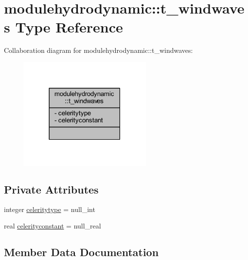 \hypertarget{structmodulehydrodynamic_1_1t__windwaves}{}\section{modulehydrodynamic\+:\+:t\+\_\+windwaves Type Reference}
\label{structmodulehydrodynamic_1_1t__windwaves}


Collaboration diagram for modulehydrodynamic\+:\+:t\+\_\+windwaves\+:\nopagebreak
\begin{figure}[H]
\begin{center}
\leavevmode
\includegraphics[width=189pt]{structmodulehydrodynamic_1_1t__windwaves__coll__graph}
\end{center}
\end{figure}
\subsection*{Private Attributes}
\begin{DoxyCompactItemize}
\item 
integer \mbox{\hyperlink{structmodulehydrodynamic_1_1t__windwaves_a2f0aa5a1fe06bbcf21cc78a316405b70}{celeritytype}} = null\+\_\+int
\item 
real \mbox{\hyperlink{structmodulehydrodynamic_1_1t__windwaves_a250b13ffad3afbe15bd361ab3ba8e1be}{celerityconstant}} = null\+\_\+real
\end{DoxyCompactItemize}


\subsection{Member Data Documentation}
\mbox{\label{structmodulehydrodynamic_1_1t__windwaves_a250b13ffad3afbe15bd361ab3ba8e1be}} 
